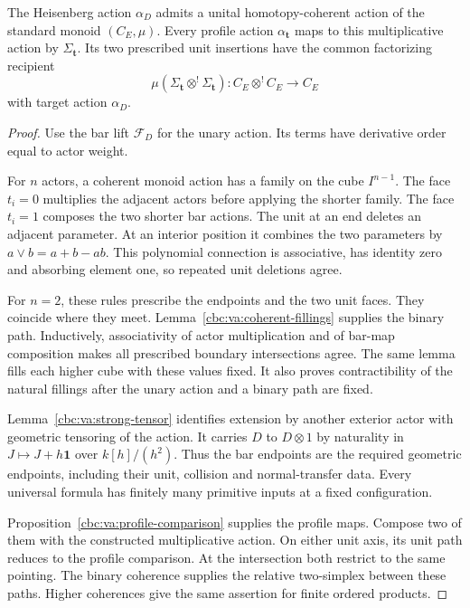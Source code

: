 \begin{theorem}\label{cbc:va:multiplicative-recipient}
The Heisenberg action $\alpha_D$ admits
a unital homotopy-coherent action of the
standard monoid $(C_E,\mu)$.
Every profile action $\alpha_{\mathbf t}$
maps to this multiplicative action by
$\Sigma_{\mathbf t}$.
Its two prescribed unit insertions have
the common factorizing recipient
\[
 \mu(\Sigma_{\mathbf t}\otimes^!\Sigma_{\mathbf t}):
 C_E\otimes^!C_E\longrightarrow C_E
\]
with target action $\alpha_D$.
\end{theorem}
\begin{proof}
Use the bar lift $\mathcal F_D$ for the
unary action. Its terms have derivative
order equal to actor weight.

For $n$ actors, a coherent monoid action
has a family on the cube $I^{n-1}$.
The face $t_i=0$ multiplies the adjacent
actors before applying the shorter family.
The face $t_i=1$ composes the two shorter
bar actions.
The unit at an end deletes an adjacent
parameter. At an interior position it
combines the two parameters by
$a\vee b=a+b-ab$.
This polynomial connection is associative,
has identity zero and absorbing element
one, so repeated unit deletions agree.

For $n=2$, these rules prescribe the
endpoints and the two unit faces.
They coincide where they meet.
Lemma~\ref{cbc:va:coherent-fillings} supplies
the binary path. Inductively, associativity
of actor multiplication and of bar-map
composition makes all prescribed boundary
intersections agree. The same lemma fills
each higher cube with these values fixed.
It also proves contractibility of the
natural fillings after the unary action
and a binary path are fixed.

Lemma~\ref{cbc:va:strong-tensor} identifies
extension by another exterior actor with
geometric tensoring of the action.
It carries $D$ to $D\otimes1$ by naturality
in $J\mapsto J+h\mathbf1$ over $k[h]/(h^2)$.
Thus the bar endpoints are the required
geometric endpoints, including their unit,
collision and normal-transfer data.
Every universal formula has finitely many
primitive inputs at a fixed configuration.

Proposition~\ref{cbc:va:profile-comparison}
supplies the profile maps.
Compose two of them with the constructed
multiplicative action. On either unit
axis, its unit path reduces to the
profile comparison. At the intersection
both restrict to the same pointing.
The binary coherence supplies the
relative two-simplex between these paths.
Higher coherences give the same assertion
for finite ordered products.
\end{proof}

